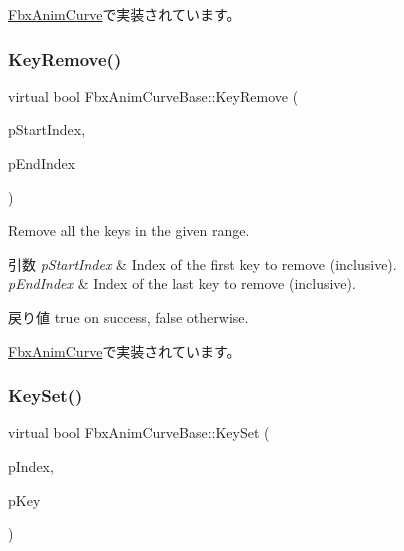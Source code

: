 \hyperlink{class_fbx_anim_curve_a083206eda111aa4c6803410427a4645c}{Fbx\+Anim\+Curve}で実装されています。

\mbox{\label{class_fbx_anim_curve_base_a2813321af80c66758eb9fbe025fd52ea}} 
\subsubsection{\texorpdfstring{Key\+Remove()}{KeyRemove()}\hspace{0.1cm}{\footnotesize\ttfamily [2/2]}}
{\footnotesize\ttfamily virtual bool Fbx\+Anim\+Curve\+Base\+::\+Key\+Remove (\begin{DoxyParamCaption}\item[{int}]{p\+Start\+Index,  }\item[{int}]{p\+End\+Index }\end{DoxyParamCaption})\hspace{0.3cm}{\ttfamily [pure virtual]}}

Remove all the keys in the given range. 
\begin{DoxyParams}{引数}
{\em p\+Start\+Index} & Index of the first key to remove (inclusive). \\
\hline
{\em p\+End\+Index} & Index of the last key to remove (inclusive). \\
\hline
\end{DoxyParams}
\begin{DoxyReturn}{戻り値}
{\ttfamily true} on success, {\ttfamily false} otherwise. 
\end{DoxyReturn}


\hyperlink{class_fbx_anim_curve_a7b4fe494d1ca4575bb253ec89f867df1}{Fbx\+Anim\+Curve}で実装されています。

\mbox{\label{class_fbx_anim_curve_base_a1a66d683a6013b5eb41d128dcbbccd4a}} 
\subsubsection{\texorpdfstring{Key\+Set()}{KeySet()}}
{\footnotesize\ttfamily virtual bool Fbx\+Anim\+Curve\+Base\+::\+Key\+Set (\begin{DoxyParamCaption}\item[{int}]{p\+Index,  }\item[{\hyperlink{class_fbx_anim_curve_key_base}{Fbx\+Anim\+Curve\+Key\+Base} \&}]{p\+Key }\end{DoxyParamCaption})\hspace{0.3cm}{\ttfamily [pure virtual]}}

